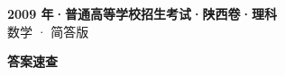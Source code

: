 \documentclass[zihao=-4, a4paper]{ctexart}
\begin{document}
\begin{center}
  {\Large\bfseries 2009 年·普通高等学校招生考试·陕西卷·理科}\\[4pt]
  {\large 数学 · 简答版}
\end{center}
\medskip
{}

\clearpage
{}
\begin{center}{\Large\bfseries 答案速查}\end{center}
\medskip

\end{document}
